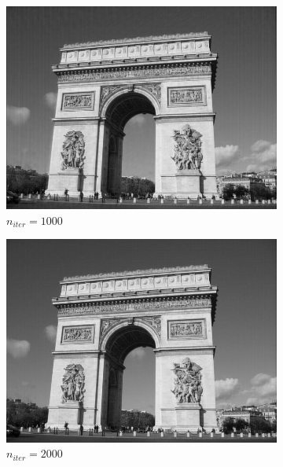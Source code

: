 \documentclass[a4paper,10pt]{report}
\begin{document}
\begin{figure}[h]
 
  \begin{subfigure}{0.5\textwidth}
    \includegraphics[width=0.99\linewidth]{ressource/arc_result_1000iter.png} 
    \caption{\(n_{iter}=1000\)}
    \label{fig:1000iter}
  \end{subfigure}
  \begin{subfigure}{0.5\textwidth}
    \includegraphics[width=0.99\linewidth]{ressource/arc_result_2000iter.png} 
    \caption{\(n_{iter}=2000\)}
    \label{fig:2000iter}
  \end{subfigure}
  \begin{subfigure}{0.5\textwidth}

\end{subfigure}
\end{figure}
\end{document}
